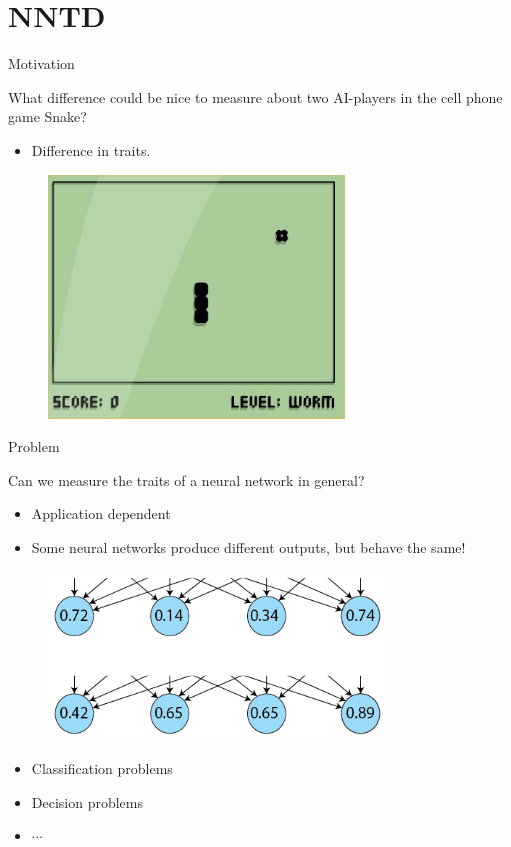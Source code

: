 \section{NNTD}
\begin{frame}{Motivation}
\begin{center}
  What difference could be nice to measure about two AI-players in the cell phone game Snake?
  \begin{itemize}
  \item Difference in traits.
  \end{itemize}
  \begin{figure}[p]
  \includegraphics[width=0.7\textwidth]{images/snake.jpg}
  \end{figure}
  \end{center}
\end{frame}


\begin{frame}{Problem}
\begin{center}
	Can we measure the traits of a neural network in general?
	\begin{itemize}
	\item Application dependent
	\item Some neural networks produce different outputs, but behave the same!
	\end{itemize}
  \begin{figure}[p]
  \includegraphics[width=0.8\textwidth]{images/whyhighestvalue.png}
  \end{figure}
\begin{itemize}
	\item Classification problems
	\item Decision problems
	\item $\cdots$
\end{itemize}
\end{center}
\end{frame}

